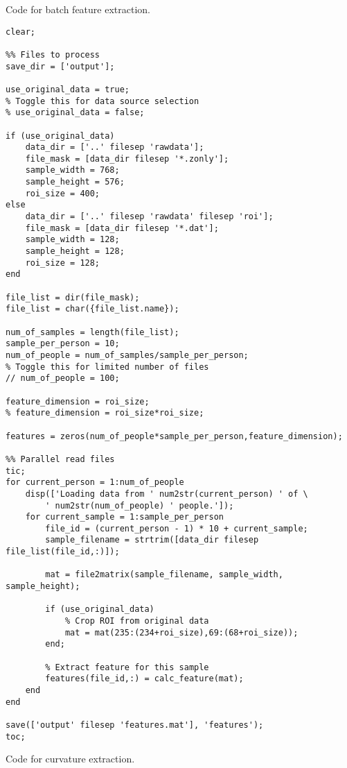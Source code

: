 Code for batch feature extraction.

\begin{verbatim}
clear;

%% Files to process
save_dir = ['output'];

use_original_data = true;
% Toggle this for data source selection
% use_original_data = false;

if (use_original_data)
    data_dir = ['..' filesep 'rawdata'];
    file_mask = [data_dir filesep '*.zonly'];
    sample_width = 768;
    sample_height = 576;
    roi_size = 400;
else
    data_dir = ['..' filesep 'rawdata' filesep 'roi'];
    file_mask = [data_dir filesep '*.dat'];
    sample_width = 128;
    sample_height = 128;
    roi_size = 128;
end

file_list = dir(file_mask);
file_list = char({file_list.name});

num_of_samples = length(file_list);
sample_per_person = 10;
num_of_people = num_of_samples/sample_per_person;
% Toggle this for limited number of files
// num_of_people = 100;

feature_dimension = roi_size;
% feature_dimension = roi_size*roi_size;

features = zeros(num_of_people*sample_per_person,feature_dimension);

%% Parallel read files
tic;
for current_person = 1:num_of_people
    disp(['Loading data from ' num2str(current_person) ' of \
		' num2str(num_of_people) ' people.']);
    for current_sample = 1:sample_per_person
        file_id = (current_person - 1) * 10 + current_sample;
        sample_filename = strtrim([data_dir filesep file_list(file_id,:)]);
        
        mat = file2matrix(sample_filename, sample_width, sample_height);
        
        if (use_original_data)
            % Crop ROI from original data
            mat = mat(235:(234+roi_size),69:(68+roi_size));
        end;
        
        % Extract feature for this sample
        features(file_id,:) = calc_feature(mat);
    end
end

save(['output' filesep 'features.mat'], 'features');
toc;
\end{verbatim}
\clearpage

Code for curvature extraction.

